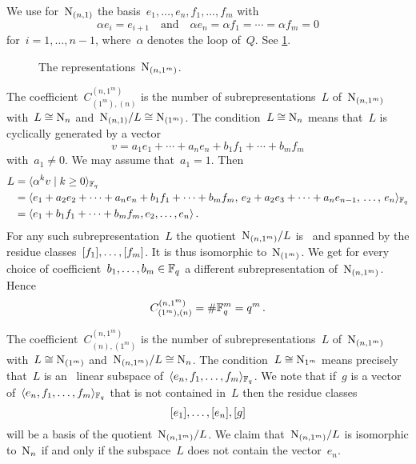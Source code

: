 \documentclass[a4paper,11pt]{scrartcl}
\begin{document}
We use for~$\mathrm{N}_{(n,1)}$ the basis~$e_1, \dotsc, e_n, f_1, \dotsc, f_m$ with
\[
  \alpha e_i = e_{i+1}
  \quad\text{and}\quad
  \alpha e_n = \alpha f_1 = \dotsb = \alpha f_m = 0
\]
for~$i = 1, \dotsc, n-1$, where~$\alpha$ denotes the loop of~$Q$.
See \cref{basis for n 1}.
\begin{figure}[tb]
  \centering
    \caption{The representations~$\mathrm{N}_{(n, 1^m)}$.}
  \label{basis for n 1}
\end{figure}

The coefficient~$C^{(n, 1^m)}_{(1^m), (n)}$ is the number of subrepresentations~$L$ of~$\mathrm{N}_{(n, 1^m)}$ with~$L \cong \mathrm{N}_n$ and~$\mathrm{N}_{(n,1)} / L \cong \mathrm{N}_{(1^m)}$.
The condition~$L \cong \mathrm{N}_n$ means that~$L$ is cyclically generated by a vector
\[
  v
  =
  a_1 e_1 + \dotsb + a_n e_n
  + b_1 f_1 + \dotsb + b_m f_m
\]
with~$a_1 \neq 0$.
We may assume that~$a_1 = 1$.
Then
\begin{align*}
  L
  &=
  \gen{ \alpha^k v \suchthat k \geq 0 }_{\Finite_q}
  \\
  &=
  \gen{
    e_1 + a_2 e_2 + \dotsb + a_n e_n
    + b_1 f_1 + \dotsb + b_m f_m,
    \,
    e_2 + a_2 e_3 + \dotsb + a_n e_{n-1},
    \,
    \dotsc,
    \,
    e_n
  }_{\Finite_q}
  \\
  &=
  \gen{ e_1 + b_1 f_1 + \dotsb + b_m f_m, e_2, \dotsc, e_n } \,.
\end{align*}
For any such subrepresentation~$L$ the quotient~$\mathrm{N}_{(n, 1^m)} / L$ is~ and spanned by the residue classes~$[f_1], \dotsc, [f_m]$.
It is thus isomorphic to~$\mathrm{N}_{(1^m)}$.
We get for every choice of coefficient~$b_1, \dotsc, b_m \in \mathbb{F}_q$ a different subrepresentation of~$\mathrm{N}_{(n, 1^m)}$.
Hence
\[
  C^{(n, 1^m)}_{(1^m), (n)}
  =
  \# \mathbb{F}_q^m
  =
  q^m \,.
\]

The coefficient~$C^{(n, 1^m)}_{(n), (1^m)}$ is the number of subrepresentations~$L$ of~$\mathrm{N}_{(n, 1^m)}$ with~$L \cong \mathrm{N}_{(1^m)}$ and~$\mathrm{N}_{(n, 1^m)}/L \cong \mathrm{N}_n$.
The condition~$L \cong \mathrm{N}_{1^m}$ means precisely that~$L$ is an~ linear subspace of~$\langle e_n, f_1, \dotsc, f_m \rangle_{\mathbb{F}_q}$.
We note that if~$g$ is a vector of~$\langle e_n, f_1, \dotsc, f_m \rangle_{\mathbb{F}_q}$ that is not contained in~$L$ then the residue classes
\[
  [e_1], \dotsc, [e_n], [g]
\]
will be a basis of the quotient~$\mathrm{N}_{(n, 1^m)} / L$.
We claim that~$\mathrm{N}_{(n, 1^m)} / L$ is isomorphic to~$\mathrm{N}_n$ if and only if the subspace~$L$ does not contain the vector~$e_n$.
\end{document}

